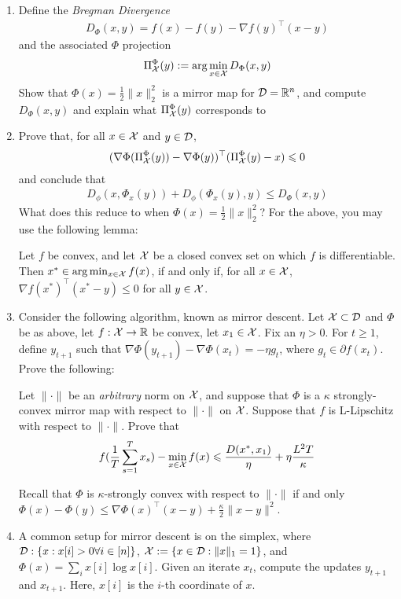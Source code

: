 \documentclass[12pt]{article}
\begin{document}
\begin{enumerate}
\item
Define the \emph{Bregman Divergence}
\begin{eqnarray}
D_{\Phi}(x,y) = f(x) - f(y) - \nabla f(y)^{\top}(x-y)
\end{eqnarray}
and the associated $\Phi$ projection
\begin{eqnarray}
\Pi_{{\cal X}}^{\Phi}(y):= \arg\min_{x \in {\cal X}} D_{\Phi}(x,y)
\end{eqnarray}
Show that $\Phi(x) = \frac{1}{2}\|x\|^2_2$ is a mirror map for ${\cal D} = \mathbb{R}^n$, and compute $D_{\Phi}(x,y)$ and explain what $\Pi_{{\cal X}}^{\Phi}(y)$ corresponds to
\item
Prove that, for all $x \in {\cal X}$ and $y \in {\cal D}$,
\begin{eqnarray}
(\nabla \Phi(\Pi_{{\cal X}}^{\Phi}(y)) - \nabla \Phi(y))^\top(\Pi_{{\cal X}}^{\Phi}(y) - x) \leqslant 0
\end{eqnarray}
and conclude that
\begin{eqnarray}
D_{\phi}(x,\Phi_{x}(y)) + D_{\phi}(\Phi_{x}(y),y) \le D_{\Phi}(x,y) 
\end{eqnarray}
What does this reduce to when $\Phi(x) = \frac{1}{2}\|x\|^2_2$? For the above, you may use the following lemma:
\begin{lemma*} Let $f$ be convex, and let ${\cal X}$ be a closed convex set on which $f$ is differentiable. Then $x^* \in \arg\min_{x \in {\cal X}} f(x)$, if and only if, for all $x \in {\cal X}$, $\nabla f(x^*)^\top ( x^* - y) \le 0$ for all $y \in {\cal X}$.
\end{lemma*}
\item
Consider the following algorithm, known as mirror descent. Let ${\cal X} \subset {\cal D}$ and $\Phi$ be as above, let $f: {\cal X} \to \mathbb{R}$ be convex, let $x_1  \in {\cal X}$. Fix an $\eta > 0$. For $t \ge 1$, define $y_{t+1}$ such that $\nabla \Phi(y_{t+1}) - \nabla \Phi(x_{t}) = -\eta g_t$, where $g_t \in \partial f(x_t)$. Prove the following:
\begin{theorem*} Let $\|\cdot\|$ be an \emph{arbitrary} norm on ${\cal X}$, and suppose that $\Phi$ is a $\kappa$ strongly-convex mirror map with respect to $\|\cdot\|$ on ${\cal X}$. Suppose that $f$ is L-Lipschitz with respect to $\|\cdot\|$. Prove that 
\begin{eqnarray}
f(\frac{1}{T}\sum_{s=1}^T x_s) - \min_{x \in {\cal X}} f(x) \leqslant \frac{D(x^*,x_1)}{\eta} + \eta \frac{L^2 T}{\kappa}
\end{eqnarray}
\end{theorem*}
Recall that $\Phi$ is $\kappa$-strongly convex with respect to $\|\cdot\|$ if and only $\Phi(x)  - \Phi(y) \le \nabla \Phi(x)^\top (x-y) + \frac{\kappa}{2}\|x-y\|^2$. 
\item
A common setup for mirror descent is on the simplex, where ${\cal D}: \{x: x[i] > 0 \forall i \in [n]\}$, ${\cal X} := \{x \in {\cal D}:\|x\|_1 = 1\}$, and $\Phi(x) = \sum_i x[i] \log x[i]$. Given an iterate $x_t$, compute the updates $y_{t+1}$ and $x_{t+1}$. Here, $x[i]$ is the $i$-th coordinate of $x$.
\end{enumerate}
\newpage
\end{document}
